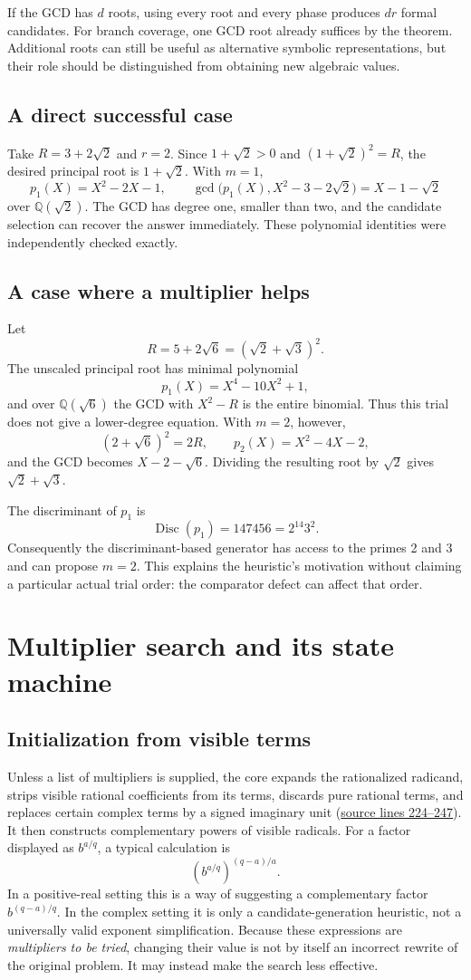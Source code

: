 \documentclass[11pt,letterpaper]{article}
\newcommand{\src}[1]{\hyperref[app:source]{source lines #1}}
\newcommand{\Q}{\mathbb{Q}}
\DeclareMathOperator{\Disc}{Disc}
\theoremstyle{definition}
\theoremstyle{remark}
\begin{document}
If the GCD has $d$ roots, using every root and every phase produces $dr$
formal candidates. For branch coverage, one GCD root already suffices by the
theorem. Additional roots can still be useful as alternative symbolic
representations, but their role should be distinguished from obtaining new
algebraic values.

\subsection{A direct successful case}
Take $R=3+2\sqrt2$ and $r=2$. Since $1+\sqrt2>0$ and
$(1+\sqrt2)^2=R$, the desired principal root is $1+\sqrt2$. With $m=1$,
\[
 p_1(X)=X^2-2X-1,
 \qquad
 \gcd\bigl(p_1(X),X^2-3-2\sqrt2\bigr)=X-1-\sqrt2
\]
over $\Q(\sqrt2)$. The GCD has degree one, smaller than two, and the candidate
selection can recover the answer immediately. These polynomial identities
were independently checked exactly.

\subsection{A case where a multiplier helps}
Let
\[
 R=5+2\sqrt6=(\sqrt2+\sqrt3)^2.
\]
The unscaled principal root has minimal polynomial
\[
 p_1(X)=X^4-10X^2+1,
\]
and over $\Q(\sqrt6)$ the GCD with $X^2-R$ is the entire binomial. Thus this
trial does not give a lower-degree equation. With $m=2$, however,
\[
 (2+\sqrt6)^2=2R,
 \qquad p_2(X)=X^2-4X-2,
\]
and the GCD becomes $X-2-\sqrt6$. Dividing the resulting root by $\sqrt2$
gives $\sqrt2+\sqrt3$.

The discriminant of $p_1$ is
\[
 \Disc(p_1)=147456=2^{14}3^2.
\]
Consequently the discriminant-based generator has access to the primes 2 and
3 and can propose $m=2$. This explains the heuristic's motivation without
claiming a particular actual trial order: the comparator defect can affect
that order.

\section{Multiplier search and its state machine}
\label{sec:search}
\subsection{Initialization from visible terms}
Unless a list of multipliers is supplied, the core expands the rationalized
radicand, strips visible rational coefficients from its terms, discards pure
rational terms, and replaces certain complex terms by a signed imaginary
unit (\src{224--247}). It then constructs complementary powers of visible
radicals. For a factor displayed as $b^{a/q}$, a typical calculation is
\[
 \left(b^{a/q}\right)^{(q-a)/a}.
\]
In a positive-real setting this is a way of suggesting a complementary factor
$b^{(q-a)/q}$. In the complex setting it is only a candidate-generation
heuristic, not a universally valid exponent simplification. Because these
expressions are \emph{multipliers to be tried}, changing their value is not by
itself an incorrect rewrite of the original problem. It may instead make the
search less effective.
\end{document}
